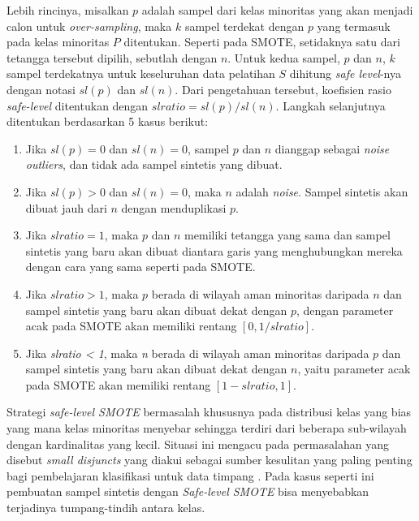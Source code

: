 Lebih rincinya, misalkan $ p $ adalah sampel dari kelas minoritas yang akan
menjadi calon untuk \textit{over-sampling}, maka $ k $ sampel terdekat dengan
$ p $ yang termasuk pada kelas minoritas $ P $ ditentukan.
Seperti pada SMOTE, setidaknya satu dari tetangga tersebut dipilih, sebutlah
dengan $ n $.
Untuk kedua sampel, $ p $ dan $ n $, $ k $ sampel terdekatnya untuk keseluruhan
data pelatihan $ S $ dihitung \textit{safe level}-nya dengan notasi $ sl(p) $
dan $ sl(n) $.
Dari pengetahuan tersebut, koefisien rasio \textit{safe-level} ditentukan
dengan $ slratio = sl(p) / sl(n) $.
Langkah selanjutnya ditentukan berdasarkan 5 kasus berikut:
\begin{enumerate}
	\item \label{case:safe-1} Jika $ sl(p) = 0 $ dan $ sl(n) = 0 $, sampel
	$ p $ dan $ n $ dianggap sebagai \textit{noise outliers}, dan tidak ada
	sampel sintetis yang dibuat.
	\item Jika $ sl(p) > 0 $ dan $ sl(n) = 0 $, maka $ n $
	adalah \textit{noise}.
	Sampel sintetis akan dibuat jauh dari $ n $ dengan menduplikasi $ p $.
	\item Jika $ slratio = 1 $, maka $ p $ dan $ n $ memiliki tetangga
	yang sama dan sampel sintetis yang baru akan dibuat diantara garis yang
	menghubungkan mereka dengan cara yang sama seperti pada SMOTE.
	\item Jika $ slratio > 1 $, maka $ p $ berada di wilayah
	aman minoritas daripada $ n $ dan sampel sintetis yang baru akan
	dibuat dekat dengan $ p $, dengan parameter acak pada SMOTE akan
	memiliki rentang $ [0, 1 / slratio] $.
	\item Jika \textit{slratio < 1}, maka \textit{n} berada di wilayah
	aman minoritas daripada $ p $ dan sampel sintetis yang baru akan
	dibuat dekat dengan $ n $, yaitu parameter acak pada SMOTE akan
	memiliki rentang $ [1 - slratio, 1] $.
\end{enumerate}

Strategi \textit{safe-level SMOTE} bermasalah khususnya pada distribusi kelas
yang bias yang mana kelas minoritas menyebar sehingga terdiri dari beberapa
sub-wilayah dengan kardinalitas yang kecil.
Situasi ini mengacu pada permasalahan yang disebut \textit{small disjuncts}
yang diakui sebagai sumber kesulitan yang paling penting bagi pembelajaran
klasifikasi untuk data timpang \cite{jo2004class}.
Pada kasus seperti ini pembuatan sampel sintetis dengan \textit{Safe-level
SMOTE} bisa menyebabkan terjadinya tumpang-tindih antara kelas.

